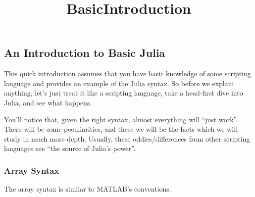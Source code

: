 \documentclass[11pt]{article}
\title{BasicIntroduction}
\begin{document}
    
    
    \maketitle
    
    

    
    \subsection{An Introduction to Basic
Julia}\label{an-introduction-to-basic-julia}

This quick introduction assumes that you have basic knowledge of some
scripting language and provides an example of the Julia syntax. So
before we explain anything, let's just treat it like a scripting
language, take a head-first dive into Julia, and see what happens.

You'll notice that, given the right syntax, almost everything will
``just work''. There will be some peculiarities, and these we will be
the facts which we will study in much more depth. Usually, these
oddies/differences from other scripting languages are ``the source of
Julia's power''.

    \subsubsection{Array Syntax}\label{array-syntax}

The array syntax is similar to MATLAB's conventions.
\end{document}
